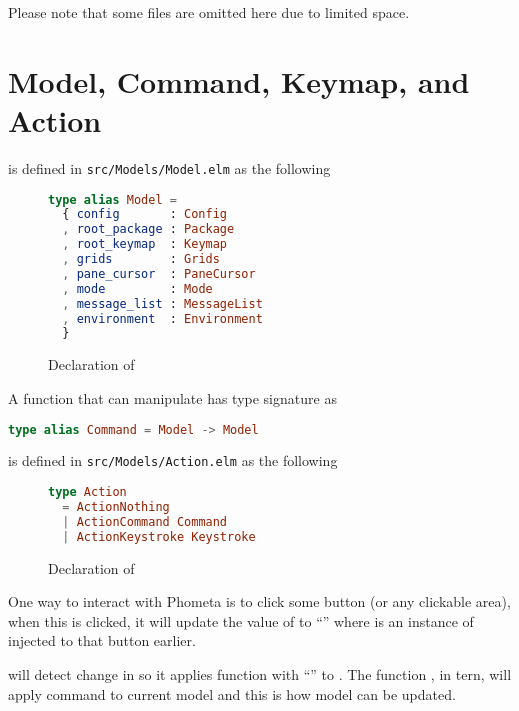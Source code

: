 \documentclass[master.tex]{subfiles}
\begin{document}
Please note that some files are omitted here due to limited space.

\newpage

\section{Model, Command, Keymap, and Action}
 is defined in \texttt{src/Models/Model.elm} as the following

\begin{figure}[H]
\begin{framed}
\begin{lstlisting}[language=elm]
type alias Model =
  { config       : Config
  , root_package : Package
  , root_keymap  : Keymap
  , grids        : Grids
  , pane_cursor  : PaneCursor
  , mode         : Mode
  , message_list : MessageList
  , environment  : Environment
  }
\end{lstlisting}
\end{framed}
\caption{Declaration of }
\label{fig:implementation-model}
\end{figure}

A function that can manipulate  has type signature as
\begin{lstlisting}[language=elm]
type alias Command = Model -> Model
\end{lstlisting}

 is defined in \texttt{src/Models/Action.elm}
as the following

\begin{figure}[H]
\begin{framed}
\begin{lstlisting}[language=elm]
type Action
  = ActionNothing
  | ActionCommand Command
  | ActionKeystroke Keystroke
\end{lstlisting}
\end{framed}
\caption{Declaration of }
\label{fig:implementation-action}
\end{figure}

One way to interact with Phometa is to click some button (or any clickable
area), when this is clicked, it will update the value of 
to ``'' where  is an instance of
 injected to that button earlier.

 will detect change in  so it applies
function  with ``'' to
. The function , in tern, will apply command
 to current model and this is how model can be updated.
\end{document}
